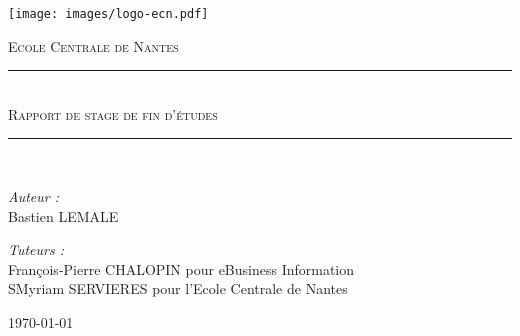 \documentclass[a4paper,twoside,12pt]{report}
\newcommand{\HRule}{\rule{\linewidth}{0.5mm}}
\begin{document}
\begin{titlepage}
	\begin{center}
		\texttt{[image: images/logo-ecn.pdf]}
				
		\textsc{\Large Ecole Centrale de Nantes}\\[1.5cm]
		\HRule \\[0.5cm]
		\textsc{\LARGE Rapport de stage de fin d'études}
		\\[0.5cm]
		\HRule	 \\[1.5cm]
		\begin{minipage}[t]{0.4\textwidth}
			\begin{flushleft}
				\emph{Auteur :}\\
				Bastien LEMALE
			\end{flushleft}
		\end{minipage}
		\begin{minipage}[t]{0.4\textwidth}
			\begin{flushright}
				\emph{Tuteurs : }\\
				François-Pierre CHALOPIN pour eBusiness Information\\
				SMyriam SERVIERES pour l'Ecole Centrale de Nantes
			\end{flushright}
		\end{minipage}
		\vfill
		{\Large \today}
	\end{center}
\end{titlepage}

\pagestyle{fancyplain}
\fancyhf{}

\pageINSA[twoside]

\setcounter{page}{1}



\newpage
{}
\tableofcontents














\end{document}
